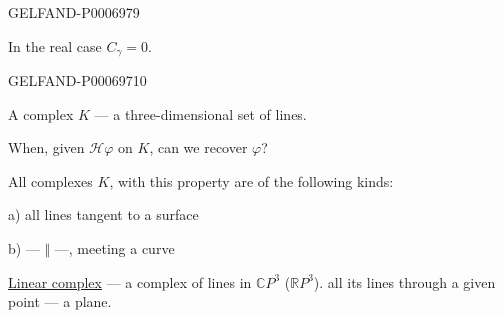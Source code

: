 \begin{GelfandAdjacentEvidence}{GELFAND-P000697}{9}

In the real case \(C_\gamma=0\).
\end{GelfandAdjacentEvidence}
\begin{GelfandAdjacentEvidence}{GELFAND-P000697}{10}


A complex \(K\) --- a three-dimensional set of lines.

When, given \(\mathcal H\varphi\) on \(K\), can we recover \(\varphi\)?
\end{GelfandAdjacentEvidence}


All complexes \(K\), with this property are of the following kinds:

a) all lines tangent to a surface

b) --- \(\Vert\) ---, meeting a curve

\underline{Linear complex} --- a complex of lines in \(\mathbb CP^3\) (\(\mathbb RP^3\)).
all its lines through a given point --- a plane.


